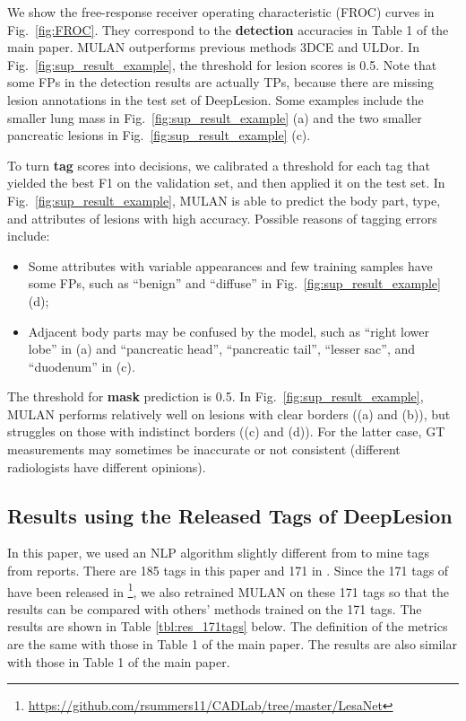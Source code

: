 \documentclass[runningheads]{llncs}
\def\Fig#1{{Fig.\ \ref{fig:#1}}}
\begin{document}
We show the free-response receiver operating characteristic (FROC) curves in \Fig{FROC}. They correspond to the \textbf{detection} accuracies in Table 1 of the main paper. MULAN outperforms previous methods 3DCE and ULDor. In \Fig{sup_result_example}, the threshold for lesion scores is 0.5. Note that some FPs in the detection results are actually TPs, because there are missing lesion annotations in the test set of DeepLesion. Some examples include the smaller lung mass in \Fig{sup_result_example} (a) and the two smaller pancreatic lesions in \Fig{sup_result_example} (c).




To turn \textbf{tag} scores into decisions, we calibrated a threshold for each tag that yielded the best F1 on the validation set, and then applied it on the test set. In \Fig{sup_result_example}, MULAN is able to predict the body part, type, and attributes of lesions with high accuracy. Possible reasons of tagging errors include:
\begin{itemize}
	\item Some attributes with variable appearances and few training samples have some FPs, such as ``benign'' and ``diffuse'' in \Fig{sup_result_example} (d);
	\item Adjacent body parts may be confused by the model, such as ``right lower lobe'' in (a) and ``pancreatic head'',	``pancreatic tail'', ``lesser sac'', and ``duodenum'' in (c).
\end{itemize}



The threshold for \textbf{mask} prediction is 0.5. In \Fig{sup_result_example}, MULAN performs relatively well on lesions with clear borders ((a) and (b)), but struggles on those with indistinct borders ((c) and (d)). For the latter case, GT measurements may sometimes be inaccurate or not consistent (different radiologists have different opinions).


\subsection{Results using the Released Tags \cite{Yan2019Lesa} of DeepLesion}

In this paper, we used an NLP algorithm slightly different from \cite{Yan2019Lesa} to mine tags from reports. There are 185 tags in this paper and 171 in \cite{Yan2019Lesa}. Since the 171 tags of \cite{Yan2019Lesa} have been released in \footnote[3]{\url{https://github.com/rsummers11/CADLab/tree/master/LesaNet}}, we also retrained MULAN on these 171 tags so that the results can be compared with others' methods trained on the 171 tags. The results are shown in Table \ref{tbl:res_171tags} below. The definition of the metrics are the same with those in Table 1 of the main paper. The results are also similar with those in Table 1 of the main paper.
\end{document}
